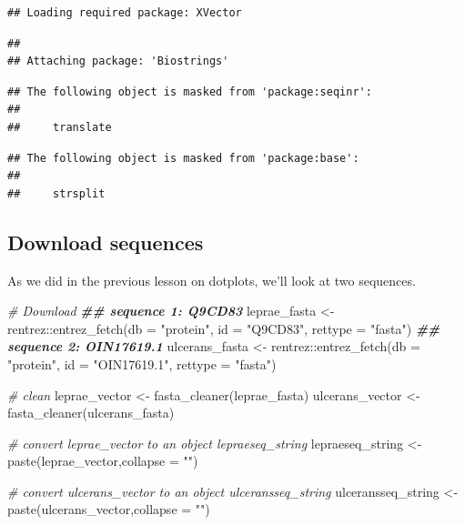 \documentclass[
]{book}
\newenvironment{Shaded}{\begin{snugshade}}{\end{snugshade}}
\newcommand{\AttributeTok}[1]{\textcolor[rgb]{0.77,0.63,0.00}{#1}}
\newcommand{\CommentTok}[1]{\textcolor[rgb]{0.56,0.35,0.01}{\textit{#1}}}
\newcommand{\DocumentationTok}[1]{\textcolor[rgb]{0.56,0.35,0.01}{\textbf{\textit{#1}}}}
\newcommand{\FunctionTok}[1]{\textcolor[rgb]{0.00,0.00,0.00}{#1}}
\newcommand{\NormalTok}[1]{#1}
\newcommand{\OtherTok}[1]{\textcolor[rgb]{0.56,0.35,0.01}{#1}}
\newcommand{\SpecialCharTok}[1]{\textcolor[rgb]{0.00,0.00,0.00}{#1}}
\newcommand{\StringTok}[1]{\textcolor[rgb]{0.31,0.60,0.02}{#1}}
\begin{document}
\begin{verbatim}
## Loading required package: XVector
\end{verbatim}

\begin{verbatim}
## 
## Attaching package: 'Biostrings'
\end{verbatim}

\begin{verbatim}
## The following object is masked from 'package:seqinr':
## 
##     translate
\end{verbatim}

\begin{verbatim}
## The following object is masked from 'package:base':
## 
##     strsplit
\end{verbatim}

\hypertarget{download-sequences}{%
\subsection{Download sequences}\label{download-sequences}}

As we did in the previous lesson on dotplots, we'll look at two sequences.

\begin{Shaded}
\begin{Highlighting}[]
\CommentTok{\# Download}
\DocumentationTok{\#\# sequence 1: Q9CD83}
\NormalTok{leprae\_fasta }\OtherTok{\textless{}{-}}\NormalTok{ rentrez}\SpecialCharTok{::}\FunctionTok{entrez\_fetch}\NormalTok{(}\AttributeTok{db =} \StringTok{"protein"}\NormalTok{,}
                        \AttributeTok{id =} \StringTok{"Q9CD83"}\NormalTok{,}
                         \AttributeTok{rettype =} \StringTok{"fasta"}\NormalTok{)}
\DocumentationTok{\#\# sequence 2: OIN17619.1}
\NormalTok{ulcerans\_fasta }\OtherTok{\textless{}{-}}\NormalTok{ rentrez}\SpecialCharTok{::}\FunctionTok{entrez\_fetch}\NormalTok{(}\AttributeTok{db =} \StringTok{"protein"}\NormalTok{,}
                         \AttributeTok{id =} \StringTok{"OIN17619.1"}\NormalTok{,}
                         \AttributeTok{rettype =} \StringTok{"fasta"}\NormalTok{)}

\CommentTok{\# clean}
\NormalTok{leprae\_vector   }\OtherTok{\textless{}{-}} \FunctionTok{fasta\_cleaner}\NormalTok{(leprae\_fasta)}
\NormalTok{ulcerans\_vector }\OtherTok{\textless{}{-}} \FunctionTok{fasta\_cleaner}\NormalTok{(ulcerans\_fasta)}

\CommentTok{\# convert leprae\_vector to an object lepraeseq\_string}
\NormalTok{lepraeseq\_string }\OtherTok{\textless{}{-}}\FunctionTok{paste}\NormalTok{(leprae\_vector,}\AttributeTok{collapse =} \StringTok{""}\NormalTok{)    }

\CommentTok{\# convert ulcerans\_vector to an object ulceransseq\_string}
\NormalTok{ulceransseq\_string }\OtherTok{\textless{}{-}}\FunctionTok{paste}\NormalTok{(ulcerans\_vector,}\AttributeTok{collapse =} \StringTok{""}\NormalTok{) }
\end{Highlighting}
\end{Shaded}
\end{document}
